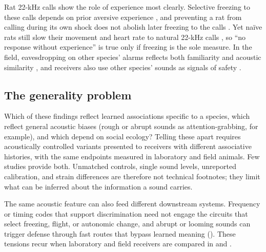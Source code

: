 Rat 22-kHz calls show the role of experience most clearly. Selective freezing to these calls depends on prior aversive experience \citep{KimEtAl2010,EndresEtAl2007}, and preventing a rat from calling during its own shock does not abolish later freezing to the calls \citep{CalubEtAl2018}. Yet naïve rats still slow their movement and heart rate to natural 22-kHz calls \citep{OlszynskiEtAl2020}, so ``no response without experience'' is true only if freezing is the sole measure. In the field, eavesdropping on other species' alarms reflects both familiarity and acoustic similarity \citep{GetschowEtAl2013,Shriner1998}, and receivers also use other species' sounds as signals of safety \citep{LillyEtAl2019}.

\subsection{The generality problem}
\label{sec:features-generality}

Which of these findings reflect learned associations specific to a species, which reflect general acoustic biases (rough or abrupt sounds as attention-grabbing, for example), and which depend on social ecology? Telling these apart requires acoustically controlled variants presented to receivers with different associative histories, with the same endpoints measured in laboratory and field animals. Few studies provide both. Unmatched controls, single sound levels, unreported calibration, and strain differences are therefore not technical footnotes; they limit what can be inferred about the information a sound carries.

The same acoustic feature can also feed different downstream systems. Frequency or timing codes that support discrimination need not engage the circuits that select freezing, flight, or autonomic change, and abrupt or looming sounds can trigger defense through fast routes that bypass learned meaning (). These tensions recur when laboratory and field receivers are compared in  and .
